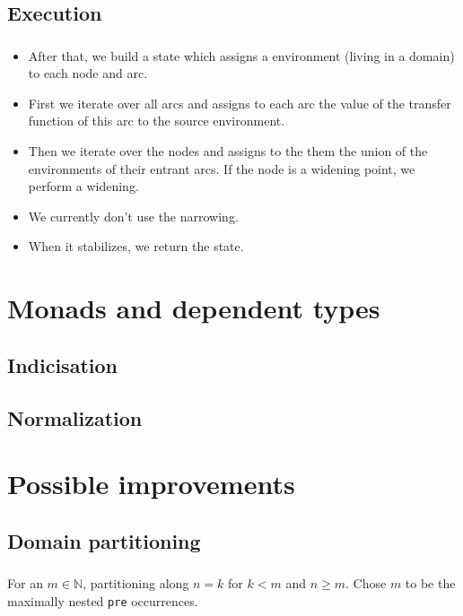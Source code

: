\documentclass[professionalfonts]{beamer}
\makeatletter
\newcommand*{\currentname}{\@currentlabelname}
\def\ft{\frametitle{\currentname}}
\makeatother
\begin{document}
\subsection{Execution}
\begin{frame}
  \ft{}
  \begin{itemize}
  \item After that, we build a state which assigns a environment (living in a domain) to each
    node and arc.
  \item First we iterate over all arcs and assigns to each arc the value of the transfer function
    of this arc to the source environment.
  \item Then we iterate over the nodes and assigns to the them the union of the environments of
    their entrant arcs. If the node is a widening point, we perform a widening.
  \item We currently don't use the narrowing.
  \item When it stabilizes, we return the state.
  \end{itemize}
\end{frame}

\section{Monads and dependent types}
\subsection{Indicisation}
\begin{frame}
  \ft{}
\end{frame}

\subsection{Normalization}
\begin{frame}
  \ft{}
\end{frame}

\section{Possible improvements}
\subsection{Domain partitioning}
\begin{frame}
  \ft{}
  For an \(m\in\mathbb{N}\), partitioning along \(n = k\) for \(k<m\) and \(n \geq m\).
  Chose \(m\) to be the maximally nested \texttt{pre} occurrences.
\end{frame}
\end{document}
